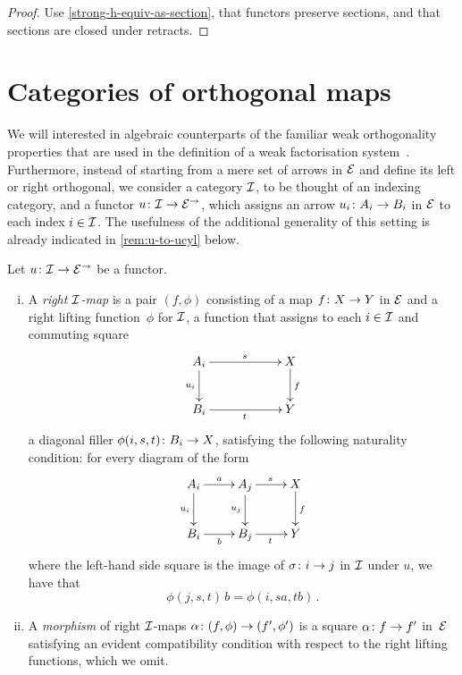 \documentclass[reqno,10pt,a4paper,oneside]{amsart}
\begin{document}
\begin{proof}
Use \cref{strong-h-equiv-as-section},  that functors preserve sections, and that  sections are closed under retracts.
\end{proof}





  


\section{Categories of orthogonal maps} 
\label{sec-orthog-functors}



 We will interested in algebraic counterparts of the familiar weak orthogonality properties that are used
 in the definition of a weak factorisation system~\cite{bousfield-wfs}. Furthermore, 
 instead of starting from a mere set of arrows in $\catE$ and define its left or right orthogonal, 
 we consider a category $\cal{I}$, to be thought of an indexing category, and a functor $u \co \cal{I} \to \catE^\to$, which assigns an arrow $u_i \co A_i \to B_i$ in $\catE$ to each index $i \in \cal{I}$. The usefulness
 of the additional generality of this setting is already indicated in \cref{rem:u-to-ucyl} below.
 

 \begin{definition} Let $u \co \cal{I} \to \catE^\to$ be a functor. 
 \begin{enumerate}[(i)] 
 \item  A \emph{right $\cal{I}$-map}
 is a pair $(f, \phi)$ consisting of a map $f \co X \to Y$ in $\cal{E}$ and a right lifting function~$\phi$ for $\cal{I}$, \ie 
 a function that assigns to each $i \in \cal{I}$ and commuting square
\[
\xymatrix@C=2cm{
A_i \ar[r]^{s}   \ar[d]_{u_i} & X \ar[d]^f \\
B_i \ar[r]_{t} & Y}
\]
a diagonal filler $\phi(i,s, t) \co B_i \to X$, satisfying the following naturality 
condition: for every diagram of the form
\[
\xymatrix{
A_i \ar[r]^a \ar[d]_{u_i} & A_j \ar[r]^{s}  \ar[d]_{u_j} & X \ar[d]^f   \\
B_i \ar[r]_{b}  & B_j  \ar[r]_{t}  & Y }
\]
where the left-hand side square is the image of $\sigma \co i \to j$ in $\cal{I}$ under $u$, 
we have that 
\[
\phi(j, s, t) \, b = \phi(i, s  a, t  b) \, .
\]
\item A \emph{morphism} of right $\cal{I}$-maps $\alpha \co (f, \phi) \to (f', \phi')$ is a 
square $\alpha \co f \to f'$ in~$\catE$ satisfying an evident compatibility condition 
with respect to the right lifting functions, which we omit. 
\end{enumerate}
\end{definition}
\end{document}
